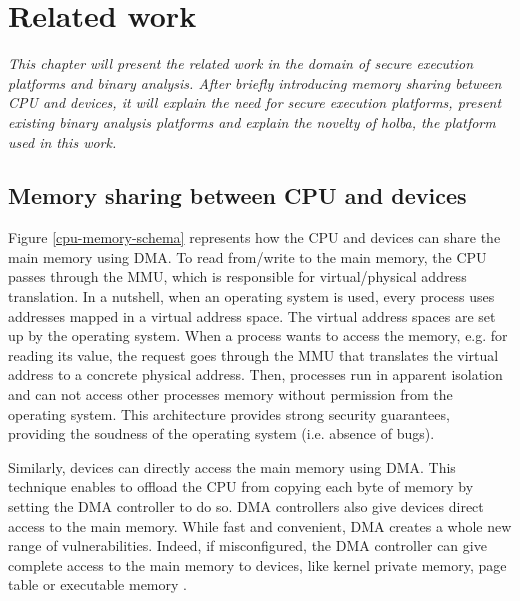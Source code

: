 \documentclass{kththesis}
\begin{document}
\chapter{Related work} \label{related-work}
\vspace{-1cm}
\textit{This chapter will present the related work in the domain of secure execution platforms and binary analysis. After briefly introducing memory sharing between \gls{CPU} and devices, it will explain the need for secure execution platforms, present existing binary analysis platforms and explain the novelty of \gls{holba}, the platform used in this work.}

\section{Memory sharing between CPU and devices}

Figure \ref{cpu-memory-schema} represents how the \gls{CPU} and devices can share the main memory using \gls{DMA}. To read from/write to the main memory, the CPU passes through the \gls{MMU}, which is responsible for virtual/physical address translation. In a nutshell, when an operating system is used, every process uses addresses mapped in a virtual address space. The virtual address spaces are set up by the operating system. When a process wants to access the memory, e.g. for reading its value, the request goes through the MMU that translates the virtual address to a concrete physical address. Then, processes run in apparent isolation and can not access other processes memory without permission from the operating system. This architecture provides strong security guarantees, providing the soudness of the operating system (i.e. absence of bugs).

Similarly, devices can directly access the main memory using DMA. This technique enables to offload the CPU from copying each byte of memory by setting the DMA controller to do so. DMA controllers also give devices direct access to the main memory. While fast and convenient, DMA creates a whole new range of vulnerabilities. Indeed, if misconfigured, the DMA controller can give complete access to the main memory to devices, like kernel private memory, page table or executable memory \cite{schwarz_formal_2014}.
\end{document}
